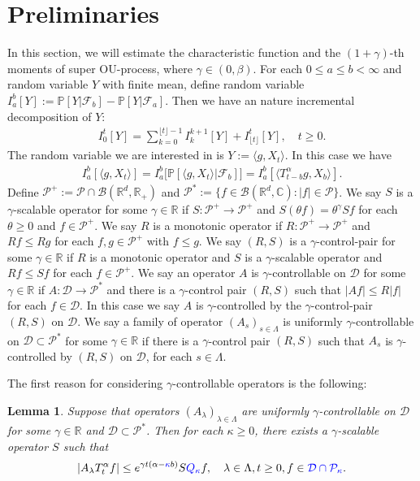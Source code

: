 \documentclass[12pt,oneside,english]{amsart}
\theoremstyle{plain}
\newtheorem{lem}[thm]{Lemma}
\theoremstyle{definition}
\numberwithin{equation}{section}
\newcommand{\added}[1]{{\color{blue}#1}}\newcommand{\deleted}[1]{{\color{red}#1}}
\begin{document}
\section{Preliminaries}
    In this section, we will estimate the characteristic function and the $(1+\gamma)$-th moments of super OU-process, where $\gamma \in (0,\beta)$.
	For each $0 \leq a \leq b <\infty$ and  random variable $Y$ with finite mean, define random variable
$
   	I_a^b[Y]
    := \mathbb P[Y|\mathscr F_b] - \mathbb P[Y|\mathscr F_a].
$
	Then we have an nature incremental decomposition of $Y$:
\begin{align}
    I_0^t[Y]
    = \sum_{k = 0}^{\lfloor t \rfloor - 1} I_k^{k+1}[Y] + I_{\lfloor t \rfloor}^t[Y],
    \quad t\geq 0.
\end{align}
	The random variable we are interested in is $Y:= \langle g,X_t\rangle$.
	In this case we have
\begin{align}
    I_a^b[\langle g,X_t\rangle]
    = I_a^b\big[\mathbb P[\langle g,X_t\rangle|\mathscr F_b]\big]
    = I_a^b[ \langle T_{t-b}^\alpha g, X_b \rangle ].
\end{align}
    Define $\mathcal P^+:= \mathcal P \cap \mathcal B(\mathbb R^d, \mathbb R_+)$ and $\mathcal P^*:= \{f\in \mathscr B(\mathbb R^d, \mathbb C): |f|\in \mathcal P\}$.
    We say $S$ is a $\gamma$-scalable operator for some $\gamma\in \mathbb R$ if $S: \mathcal P^+ \to \mathcal P^+$ and $S(\theta f) = \theta^\gamma Sf$ for each $\theta \geq 0$ and $f \in \mathcal P^+$.
    We say $R$ is a monotonic operator if $R:\mathcal P^+ \to \mathcal P^+$ and $Rf \leq Rg$ for each $f, g \in \mathcal P^+$ with $f\leq g$.
    We say $(R,S)$ is a $\gamma$-control-pair for some $\gamma \in \mathbb R$ if $R$ is a monotonic operator and $S$ is a $\gamma$-scalable operator and $Rf\leq Sf$ for each $f\in \mathcal P^+$.
    We say an operator $A$ is $\gamma$-controllable on $\mathcal D $ for some $\gamma \in \mathbb R$ if $A: \mathcal D \to \mathcal P^*$ and there  is a $\gamma$-control pair $(R,S)$ such that $|Af|\leq R|f|$ for each $f\in \mathcal D$.
    In this case we say $A$ is $\gamma$-controlled by the $\gamma$-control-pair $(R,S)$ on $\mathcal D$.
    We say a family of operator $(A_s)_{s\in \Lambda}$ is uniformly $\gamma$-controllable on $\mathcal D\subset \mathcal P^*$ for some $\gamma \in \mathbb R$ if there is a $\gamma$-control pair $(R,S)$ such that $A_s$ is $\gamma$-controlled by $(R, S)$ on $\mathcal D$, for each $s\in \Lambda$.

    The first reason for considering $\gamma$-controllable operators is the following:
\begin{lem}
    Suppose that operators $(A_\lambda)_{\lambda\in \Lambda}$ are uniformly $\gamma$-controllable on $\mathcal D$ for some $\gamma \in \mathbb R$ and $\mathcal D \subset \mathcal P^*$.
    Then \added{for each $\kappa\geq0$,} there exists a $\gamma$-scalable operator $S$ such that
\[
    |A_\lambda T_t^\alpha f|
    \leq e^{\gamma t (\alpha  - \added{\kappa} b)} S\added{Q_{\kappa}}f,
    \quad \lambda \in \Lambda, t\geq 0, f\in \added{ \mathcal{D}\cap\mathcal{P}_{\kappa}}.
\]
\end{lem}
\end{document}
